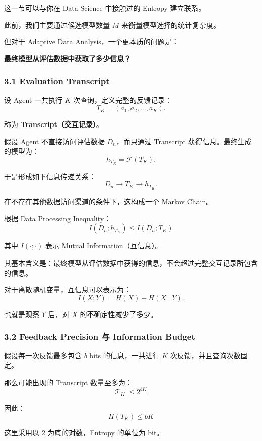 这一节可以与你在 Data Science 中接触过的 Entropy 建立联系。

此前，我们主要通过候选模型数量 \(M\) 来衡量模型选择的统计复杂度。

但对于 Adaptive Data Analysis，一个更本质的问题是：

\textbf{最终模型从评估数据中获取了多少信息？}

\hypertarget{part-2-20-0001-evaluation-transcript}{%
\subsubsection{3.1 Evaluation Transcript}\label{part-2-20-0001-evaluation-transcript}}

设 Agent 一共执行 \(K\) 次查询，定义完整的反馈记录：
\[T_K=(a_1,a_2,\ldots,a_K).\]

称为 \textbf{Transcript（交互记录）}。

假设 Agent 不直接访问评估数据 \(D_n\)，而只通过 Transcript 获得信息。最终生成的模型为：
\[h_{T_K}=\mathcal F(T_K).\]

于是形成如下信息传递关系：
\[D_n\longrightarrow T_K\longrightarrow h_{T_K}.\]

在不存在其他数据访问渠道的条件下，这构成一个 Markov Chain。

根据 Data Processing Inequality：
\[\boxed{
I(D_n;h_{T_K})
\leq
I(D_n;T_K)
}\]

其中 \(I(\cdot;\cdot)\) 表示 Mutual Information（互信息）。

其基本含义是：最终模型从评估数据中获得的信息，不会超过完整交互记录所包含的信息。

对于离散随机变量，互信息可以表示为：
\[I(X;Y)=H(X)-H(X\mid Y).\]

也就是观察 \(Y\) 后，对 \(X\) 的不确定性减少了多少。

\hypertarget{part-2-20-0001-feedback-precision-ux4e0e-information-budget}{%
\subsubsection{3.2 Feedback Precision 与 Information Budget}\label{part-2-20-0001-feedback-precision-ux4e0e-information-budget}}

假设每一次反馈最多包含 \(b\) bits 的信息，一共进行 \(K\) 次反馈，并且查询次数固定。

那么可能出现的 Transcript 数量至多为：
\[|\mathcal T_K|\leq 2^{bK}.\]

因此：
\[H(T_K)\leq bK\]

这里采用以 2 为底的对数，Entropy 的单位为 bit。

